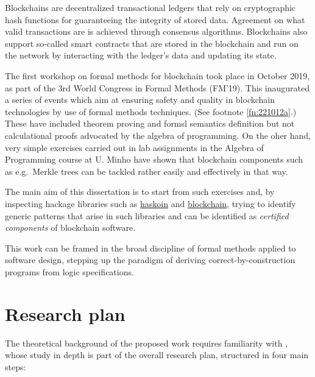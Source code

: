 \documentclass[a4paper, 11pt]{article} %
\begin{document}
Blockchains are decentralized transactional ledgers that rely on cryptographic hash functions for guaranteeing the integrity of stored data. Agreement on what valid transactions are is achieved through consensus algorithms. Blockchains also support so-called smart contracts that are stored in the blockchain and run on the network by interacting with the ledger’s data and updating its state. 

The first workshop on formal methods for blockchain took place in October 2019, as part of the 3rd World Congress in Formal Methods (FM'19). This inaugurated a series of events which aim at ensuring safety and quality in blockchain technologies by use of formal methods techniques. (See footnote \ref{fn:221012a}.) These have included theorem proving and formsl semantics definition but not calculational proofs advocated by the algebra of programming. On the oher hand, very simple exercises carried out in lab assignments in the Algebra of Programming course at U. Minho have shown that blockchain components such as e.g.\ Merkle trees can be tackled rather easily and effectively in that way.

The main aim of this dissertation is to start from such exercises and,
by inspecting hackage libraries such as \href{https://hackage.haskell.org/package/haskoin-core}{haskoin} and \href{https://hackage.haskell.org/package/blockchain}{blockchain}, trying to identify generic patterns that arise in such libraries and can be identified as \emph{certified components} of blockchain software.

This work can be framed in the broad discipline of formal methods applied to
software design, stepping up the paradigm of deriving correct-by-construction
programs from logic specifications.


\section*{Research plan}

The theoretical background of the proposed work requires familiarity with
\cite{BM97,Ol05}, whose study in depth is part of
the overall research plan, structured in four main steps:
\end{document}
